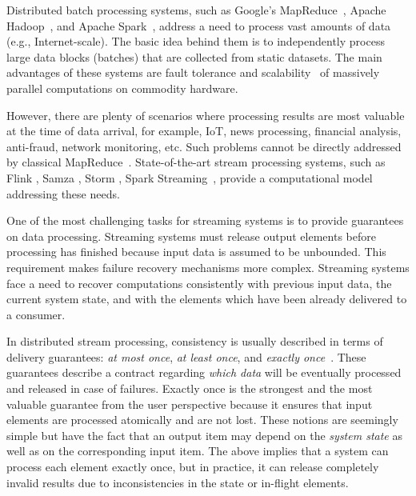 
\label {fs-intro-seciton}

Distributed batch processing systems, such as Google's MapReduce~\cite{Dean:2008:MSD:1327452.1327492}, Apache Hadoop~\cite{hadoop2009hadoop}, and Apache Spark~\cite{Zaharia:2016:ASU:3013530.2934664}, address a need to process vast amounts of data (e.g., Internet-scale). 
The basic   idea behind them is to independently process large data blocks (batches) that are collected from static datasets. 
The main advantages of these systems are fault tolerance and scalability~\cite{borthakur2011apache} of massively parallel computations on commodity hardware.

However, there are plenty of scenarios where processing results are most valuable at the time of data arrival, for example, IoT, news processing, financial analysis, anti-fraud, network monitoring, etc. 
Such problems cannot be directly addressed by classical MapReduce~\cite{Doulkeridis:2014:SLA:2628707.2628782}. 
State-of-the-art stream processing systems, such as Flink \cite{carbone2015apache}, Samza \cite{Noghabi:2017:SSS:3137765.3137770}, Storm \cite{apache:storm}, Spark Streaming~\cite{Zaharia:2012:DSE:2342763.2342773},   provide a computational model addressing these needs.

One of the most challenging tasks for streaming systems is to provide guarantees on data processing. 
Streaming systems must release output elements before processing has finished because input data is assumed to be unbounded. 
This requirement makes failure recovery mechanisms more complex. 
Streaming systems face a need to recover computations consistently with previous input data, the current system state, and with the elements which have been already delivered to a consumer. 

In distributed stream processing, consistency is usually described in terms of delivery guarantees: {\em at most once}, {\em at least once}, and {\em exactly once}~\cite{carbone2015apache}. These guarantees describe a contract regarding {\em which data} will be eventually processed and released in case of failures. Exactly once is the strongest and the most valuable guarantee from the user perspective because it ensures that input elements are processed atomically and are not lost. These notions are seemingly simple but have the fact that an output item may depend on the {\em system state} as well as on the corresponding input item. The above implies that a system can process each element exactly once, but in practice, it can release completely invalid results due to inconsistencies in the state or in-flight elements.

